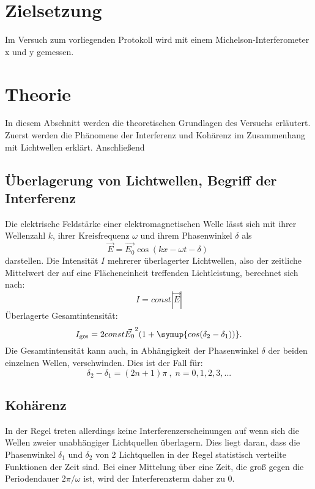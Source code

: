 \section*{Zielsetzung}
\label{sec:zielsetzung}

Im Versuch zum vorliegenden Protokoll wird mit einem Michelson-Interferometer x und y gemessen.

\section{Theorie}
\label{sec:Theorie}
In diesem Abschnitt werden die theoretischen Grundlagen des Versuchs erläutert. Zuerst werden die Phänomene der Interferenz und Kohärenz im Zusammenhang mit Lichtwellen erklärt. Anschließend 
\subsection{Überlagerung von Lichtwellen, Begriff der Interferenz}
Die elektrische Feldstärke einer elektromagnetischen Welle lässt sich mit ihrer Wellenzahl $k$, ihrer Kreisfrequenz $\omega$ und ihrem Phasenwinkel $\delta$ als
\begin{equation}
    \label{eqn:emwelle}
    \vec{E} = \vec{E_0} \cos(kx - \omega t - \delta) \; 
\end{equation}
darstellen. \newline
Die Intensität $I$ mehrerer überlagerter Lichtwellen, also der zeitliche Mittelwert der auf eine Flächeneinheit treffenden Lichtleistung, berechnet sich nach:
\begin{equation}
    \label{eqn:Intensität}
    I = const |\vec{E}|
\end{equation}
Überlagerte Gesamtintensität:
\begin{equation}
    I_\text{ges} = 2 const \vec{E_0}^2 (1 + \symup{cos(\delta_2 - \delta_1))}.
\end{equation}
Die Gesamtintensität kann auch, in Abhängigkeit der Phasenwinkel $\delta$ der beiden einzelnen Wellen, verschwinden. Dies ist der Fall für:
\begin{equation}
    \delta_2 - \delta_1 = (2n + 1)\pi \: , \; n = 0,1,2,3,... 
\end{equation}

\subsection{Kohärenz}
In der Regel treten allerdings keine Interferenzerscheinungen auf wenn sich die Wellen zweier unabhängiger Lichtquellen überlagern. Dies liegt daran, dass die Phasenwinkel $\delta_1$ und $\delta_2$ von 2 Lichtquellen in der Regel statistisch verteilte Funktionen der Zeit sind. Bei einer Mittelung über eine Zeit, die groß
gegen die Periodendauer $2\pi/\omega$ ist, wird der Interferenzterm daher zu 0.

